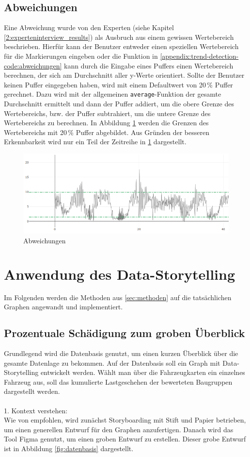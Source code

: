 \subsection{Abweichungen}
Eine Abweichung wurde von den Experten (siehe Kapitel \ref{2:experteninterview_results}) als Ausbruch aus einem gewissen Wertebereich beschrieben. Hierfür kann der Benutzer entweder einen speziellen Wertebereich für die Markierungen eingeben oder die Funktion in \ref{appendix:trend-detection-code:abweichungen} kann durch die Eingabe eines Puffers einen Wertebereich berechnen, der sich am Durchschnitt aller y-Werte orientiert. Sollte der Benutzer keinen Puffer eingegeben haben, wird mit einem Defaultwert von 20\,\% Puffer gerechnet. Dazu wird mit der allgemeinen \texttt{average}-Funktion der gesamte Durchschnitt ermittelt und dann der Puffer addiert, um die obere Grenze des Wertebereichs, bzw. der Puffer subtrahiert, um die untere Grenze des Wertebereichs zu berechnen. In Abbildung \ref{fig:deviations} werden die Grenzen des Wertebereichs mit 20\,\% Puffer abgebildet. Aus Gründen der besseren Erkennbarkeit wird nur ein Teil der Zeitreihe in \ref{fig:deviations} dargestellt.
\begin{figure}[h!]
\centering
\includegraphics[width=\textwidth]{gfx/deviations.png}
\caption{Abweichungen}
\label{fig:deviations}
\end{figure}
\section{Anwendung des Data-Storytelling}
Im Folgenden werden die Methoden aus \ref{sec:methoden} auf die tatsächlichen Graphen angewandt und implementiert.
\subsection{Prozentuale Schädigung zum groben Überblick}\label{section:Prozentuale_Schädigung}
Grundlegend wird die Datenbasis genutzt, um einen kurzen Überblick über die gesamte Datenlage zu bekommen. Auf der Datenbasis soll ein Graph mit Data-Storytelling entwickelt werden. Wählt man über die Fahrzeugkarten ein einzelnes Fahrzeug aus, soll das kumulierte Lastgeschehen der bewerteten Baugruppen dargestellt werden. \\\\
1. Kontext verstehen:\\
Wie von \cite{Knaflic.2016} empfohlen, wird zunächst Storyboarding mit Stift und Papier betrieben, um einen generellen Entwurf für den Graphen anzufertigen. Danach wird das Tool Figma \cite{FigmaGmbH.2024} genutzt, um einen groben Entwurf zu erstellen. Dieser grobe Entwurf ist in Abbildung \ref{fig:datenbasis} dargestellt.

